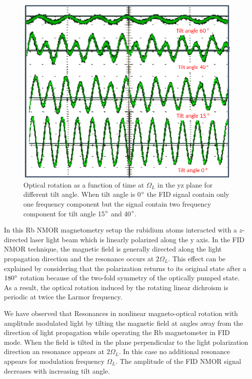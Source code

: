 \begin{figure}
  \centering
\includegraphics[width=\textwidth]{figures/tilted_field_scope_trace.png}
  \caption{Optical rotation as a function of time at $\Omega_L$ in the yz plane for different tilt angle. When tilt angle is 0$\degree$ the FID signal contain only one frequency component but the signal contain two frequency component for tilt angle 15$\degree$ and 40$\degree$.  \label{fig:optical-rotation-different-angle}}
    \label{fig:tilted}
\end{figure}
In this Rb NMOR magnetometry setup the rubidium atoms interacted with a $z$-directed laser light beam which is linearly polarized
along the y axis. In the FID NMOR technique, the magnetic field is generally directed along the light propagation direction and the resonance occurs at $2\Omega_L$.  This effect can be explained by considering that the polarization returns to its original state after a $180\degree$ rotation because of the two-fold symmetry of the optically pumped state. As a result, the optical rotation induced by the rotating linear dichroism is periodic at twice the Larmor frequency.

We have observed that Resonances in nonlinear magneto-optical rotation with amplitude modulated light by tilting the magnetic field at angles away from the direction of light propagation while operating the Rb magnetometer in FID mode. When the field is tilted in the plane perpendicular to the light polarization direction an resonance appears at $2\Omega_L$. In this case no additional resonance appears for modulation frequency $\Omega_L$. The amplitude of the FID NMOR signal decreases with increasing tilt angle. 

